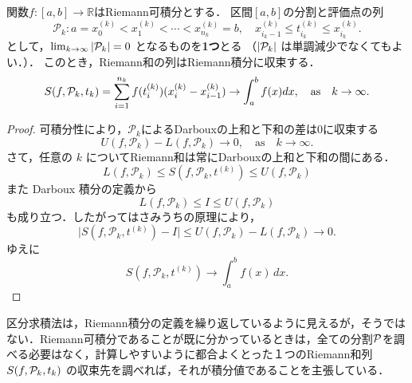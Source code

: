 \begin{theorem}[区分求積法]
    関数$f : [a,b] \to \mathbb{R}$はRiemann可積分とする．
    区間$[a,b]$の分割と評価点の列
    \[\mathcal{P}_k : a=x_0^{(k)} < x_1^{(k)} < \cdots < x_{n_k}^{(k)}=b, \quad x_{i_k-1}^{(k)} \le t_{i_k}^{(k)} \le x_{i_k}^{(k)}.\]
    として，$\lim_{k \to \infty} |\mathcal P_k| = 0$ となるものを\textbf{1つ}とる
    （$|\mathcal P_k|$ は単調減少でなくてもよい．）．
    このとき，Riemann和の列はRiemann積分に収束する．
    \[
    S(f,\mathcal P_k,t_k) = \sum_{i=1}^{n_k} f(t_i^{(k)}) (x_{i}^{(k)} - x_{i-1}^{(k)}) \to \int_a^b f(x) dx, \quad \text{as} \quad k \to \infty.
    \]
\end{theorem}
\begin{proof}
    可積分性により，$\mathcal P_k$によるDarbouxの上和と下和の差は$0$に収束する
    \[
    U(f,\mathcal{P}_k) - L(f,\mathcal{P}_k) \to 0, \quad \text{as} \quad k \to \infty.
    \]
さて，任意の $k$ についてRiemann和は常にDarbouxの上和と下和の間にある．
\[
L(f,\mathcal P_k)\le S(f,\mathcal P_k,t^{(k)})\le U(f,\mathcal P_k)
\]
また Darboux 積分の定義から
\[
L(f,\mathcal P_k)\le I\le U(f,\mathcal P_k)
\]
も成り立つ．したがってはさみうちの原理により，
\[
\bigl|S(f,\mathcal P_k,t^{(k)})-I\bigr|
\le
U(f,\mathcal P_k)-L(f,\mathcal P_k)\to 0.
\]
ゆえに
\[
S(f,\mathcal P_k,t^{(k)})\to \int_a^b f(x)\,dx.
\]
\end{proof}

\begin{remark}
    区分求積法は，Riemann積分の定義を繰り返しているように見えるが，そうではない．Riemann可積分であることが既に分かっているときは，全ての分割$\mathcal P$を調べる必要はなく，計算しやすいように都合よくとった１つのRiemann和列 $S(f,\mathcal P_k,t_k)$ の収束先を調べれば，それが積分値であることを主張している．
\end{remark}

